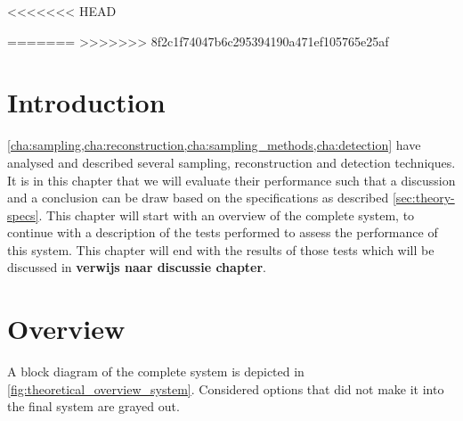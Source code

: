 \documentclass[a4paper, openany, oneside]{memoir}
\begin{document}
<<<<<<< HEAD

=======
>>>>>>> 8f2c1f74047b6c295394190a471ef105765e25af
\section{Introduction}

\cref{cha:sampling,cha:reconstruction,cha:sampling_methods,cha:detection} have analysed and described several
sampling, reconstruction and detection techniques. It is in this chapter that we will evaluate their performance such that a discussion and a conclusion can be draw based on the specifications as described \cref{sec:theory-specs}. This chapter will start with an overview of the complete system, to continue with a description of the tests performed to assess the performance of this system. This chapter will end with the results
of those tests which will be discussed in \textbf{verwijs naar discussie chapter}.

\section{Overview}
A block diagram of the complete system is depicted in \cref{fig:theoretical_overview_system}. Considered options that did not make it into
the final system are grayed out. 
\end{document}
